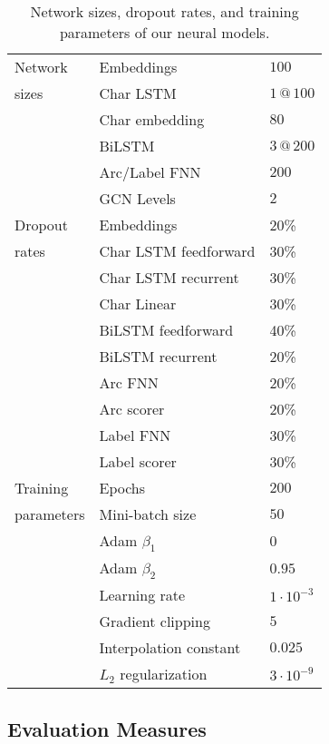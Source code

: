 \documentclass[11pt,a4paper]{article}
\theoremstyle{plain}
\begin{document}
\begin{table}
  \centering\small
  \begin{tabular}{lll}%
    \toprule
    Network & Embeddings & $100$ \\%
    sizes & Char LSTM & $1 \mathbin{@} 100$ \\
    & Char embedding & $80$ \\
    & BiLSTM & $3 \mathbin{@} 200$ \\
    & Arc/Label FNN & $200$ \\       %
    & GCN Levels & $2$ \\       %
    \midrule
Dropout & Embeddings & 20\% \\%
rates & Char LSTM feedforward & 30\% \\
& Char LSTM recurrent & 30\% \\
& Char Linear & 30\% \\
& BiLSTM feedforward & 40\% \\
& BiLSTM recurrent & 20\% \\
& Arc FNN & 20\% \\
& Arc scorer & 20\% \\
& Label FNN & 30\% \\
& Label scorer & 30\% \\%
    \midrule
    Training & Epochs & $200$ \\%
    parameters &
    Mini-batch size & $50$ \\
&    Adam $\beta_1$ & $0$ \\
&    Adam $\beta_2$ & $0.95$ \\
&    Learning rate & $1 \cdot 10^{-3}$ \\
&    Gradient clipping & $5$ \\
&    Interpolation constant & $0.025$ \\
&    $L_2$ regularization & $3 \cdot 10^{-9}$ \\ %
    \bottomrule
  \end{tabular}
  \caption[Network Hidden Sizes]{Network sizes, dropout rates, and training parameters of our neural models.}
  \label{tab:method_sizes}%
\end{table}

\subsection{Evaluation Measures}
\end{document}
